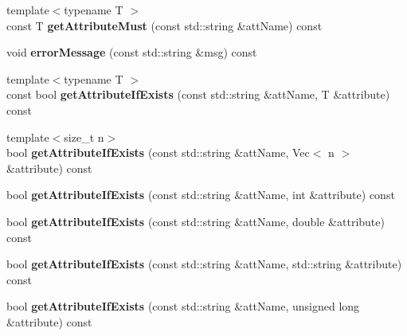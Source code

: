 \begin{DoxyCompactItemize}
{\footnotesize template$<$typename T $>$ }\\const T {\bfseries get\+Attribute\+Must} (const std\+::string \&att\+Name) const
\item 
\mbox{\label{classraisim_1_1RaiSimTinyXmlWrapper_ac6f56ddd9c2ae63e98ac6276e4192fe8}} 
void {\bfseries error\+Message} (const std\+::string \&msg) const
\item 
\mbox{\label{classraisim_1_1RaiSimTinyXmlWrapper_a2dd48321c1708cd9b596266a9e863ecd}} 
{\footnotesize template$<$typename T $>$ }\\const bool {\bfseries get\+Attribute\+If\+Exists} (const std\+::string \&att\+Name, T \&attribute) const
\item 
\mbox{\label{classraisim_1_1RaiSimTinyXmlWrapper_acacb4a4bb4ddd0a7729c4181ab87f704}} 
{\footnotesize template$<$size\+\_\+t n$>$ }\\bool {\bfseries get\+Attribute\+If\+Exists} (const std\+::string \&att\+Name, Vec$<$ n $>$ \&attribute) const
\item 
\mbox{\label{classraisim_1_1RaiSimTinyXmlWrapper_a4285ac48a2d4db27a0af38660e1e86c7}} 
bool {\bfseries get\+Attribute\+If\+Exists} (const std\+::string \&att\+Name, int \&attribute) const
\item 
\mbox{\label{classraisim_1_1RaiSimTinyXmlWrapper_a9520a5906aa186612011a06e852b1b62}} 
bool {\bfseries get\+Attribute\+If\+Exists} (const std\+::string \&att\+Name, double \&attribute) const
\item 
\mbox{\label{classraisim_1_1RaiSimTinyXmlWrapper_ae516b8b835c515257394865ecef32000}} 
bool {\bfseries get\+Attribute\+If\+Exists} (const std\+::string \&att\+Name, std\+::string \&attribute) const
\item 
\mbox{\label{classraisim_1_1RaiSimTinyXmlWrapper_a3a913c76e9277c22f36da258ee426969}} 
bool {\bfseries get\+Attribute\+If\+Exists} (const std\+::string \&att\+Name, unsigned long \&attribute) const
\item 

\end{DoxyCompactItemize}
